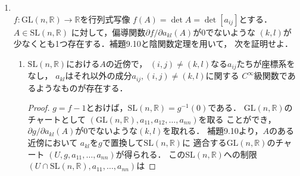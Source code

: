 \documentclass[dvipdfmx,a4paper,11pt]{jsarticle}
\begin{document}
\begin{enumerate}
\begin{proof}
    開写像であることを示す．
    多様体の定義にハウスドルフ性が含まれていたことを踏まえると，
    $f$はコンパクト空間からハウスドルフ空間への連続写像であるから
    ，閉写像である\footnote{
      コンパクト空間の閉部分集合はコンパクトで，
      コンパクト空間の連続写像による像はコンパクトとなり，
      ハウスドルフ空間のコンパクト部分集合は閉集合であるため．
    }．
    さて，任意に$U\in\mathcal{O}_N$を取ると，以下が成り立つ．
    \begin{align}
      U\in\mathcal{O}_N&\implies N\setminus U\in\mathcal{C}_N\\
      &\implies f(N\setminus U)\in\mathcal{C}_M\\
      &\implies M\setminus f(N\setminus U)\in\mathcal{O}_M
    \end{align}
    ここで，$M\setminus f(N\setminus U)$を$V$とおくと，
    $f(U)=f(N)\cap V$である．
    よって任意の$U$に対して$f(U)=f(N)\cap V$なる$V\in\mathcal{O}_M$が
    存在し，
    これはすなわち$f(U)$が$f(N)$の部分空間位相に関して開であることを
    意味する．\\
    以上より$f\colon N\to f(N)$は$f(N)$の部分空間位相
    に関して同相写像であり，したがって$f$は埋め込みである．
  \end{proof}
  \item {}\\
  $f\colon \text{GL}(n,\mathbb{R})\to\mathbb{R}$を行列式写像
  $f(A)=\det A=\det[a_{ij}]$とする．$A\in \text{SL}(n,\mathbb{R})$
  に対して，偏導関数$\partial f/\partial a_{kl}(A)$が0でないような
  $(k,l)$が少なくとも1つ存在する．補題9.10と陰関数定理を用いて，
  次を証明せよ．
  \begin{enumerate}
    \item $\text{SL}(n,\mathbb{R})$における$A$の近傍で，
    $(i,j)\neq(k,l)$なる$a_{ij}$たちが座標系をなし，
    $a_{kl}$はそれ以外の成分$a_{ij},(i,j)\neq(k,l)$に関する
    $C^\infty$級関数であるようなものが存在する．
    \begin{proof}
      $g=f-1$とおけば，$\text{SL}(n,\mathbb{R})=g^{-1}(0)$である．
      $\text{GL}(n,\mathbb{R})$のチャートとして
      $(\text{GL}(n,\mathbb{R}),a_{11},a_{12},\dots,a_{nn})$を取る
      ことができ，
      $\partial g/\partial a_{kl}(A)$が0でないような$(k,l)$を取れる．
      補題9.10より，$A$のある近傍において
      $a_{kl}$を$g$で置換して$\text{SL}(n,\mathbb{R})$に
      適合する$\text{GL}(n,\mathbb{R})$のチャート
      $(U,g,a_{11},\dots,a_{nn})$が得られる．
      このSL$(n,\mathbb{R})$への制限$(U\cap\text{SL}(n,\mathbb{R}),
      a_{11},\dots,a_{nn})$は

\end{proof}
\end{enumerate}
\end{enumerate}
\end{document}
